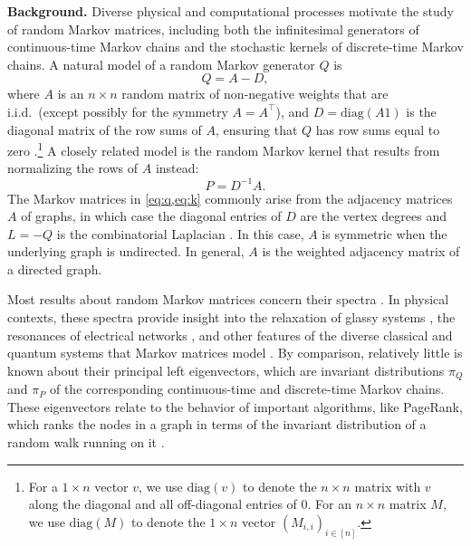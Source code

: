\documentclass[12pt]{amsart}
\DeclareMathOperator{\1}{\mathbf{1}}
\begin{document}
\noindent
{\bf Background.} Diverse physical and computational processes motivate the study of random Markov matrices, including both the infinitesimal generators of continuous-time Markov chains and the stochastic kernels of discrete-time Markov chains. A natural model of a random Markov generator $Q$ is
\begin{equation}\label{eq:q}
    Q = A - D,
\end{equation}
where $A$ is an $n \times n$ random matrix of non-negative weights that are i.i.d.\ (except possibly for the symmetry $A = A^\top$), and $D = \mathrm{diag}(A 1)$ is the diagonal matrix of the row sums of $A$, ensuring that $Q$ has row sums equal to zero \cite{MR3168123}.\footnote{For a $1 \times n$ vector $v$, we use $\mathrm{diag}(v)$ to denote the $n \times n$ matrix with $v$ along the diagonal and all off-diagonal entries of $0$. For an $n \times n$ matrix $M$, we use $\mathrm{diag}(M)$ to denote the $1 \times n$ vector $(M_{i,i})_{i \in [n]}$.} A closely related model is the random Markov kernel that results from normalizing the rows of $A$ instead:
\begin{equation}\label{eq:k}
    P = D^{-1} A.
\end{equation}
The Markov matrices in \cref{eq:q,eq:k} commonly arise from the adjacency matrices $A$ of graphs, in which case the diagonal entries of $D$ are the vertex degrees and $L = -Q$ is the combinatorial Laplacian \cite{MR3730470}. In this case, $A$ is symmetric when the underlying graph is undirected. In general, $A$ is the weighted adjacency matrix of a directed graph.

Most results about random Markov matrices concern their spectra \cite{MR2575404,MR2644041,MR2857250,MR2892961,MR3168123,MR3189068,MR3717992,MR4440252,MR4716339}. In physical contexts, these spectra provide insight into the relaxation of glassy systems \cite{MR972445}, the resonances of electrical networks \cite{MR1747178,StaringMehligFyodorovLuck2003ImpedanceNetworks}, and other features of the diverse classical and quantum systems that Markov matrices model \cite{Timm2009RandomTransitionRate,MR2539237,MR2488493,Tarnowski2021Superdecoherence,NakerstDenisovHaque2023SparseGenerators}. By comparison, relatively little is known about their principal left eigenvectors, which are invariant distributions $\pi_Q$ and $\pi_P$ of the corresponding continuous-time and discrete-time Markov chains. These eigenvectors relate to the behavior of important algorithms, like PageRank, which ranks the nodes in a graph in terms of the invariant distribution of a random walk running on it \cite{MR3683363,MR4973694}.
\end{document}
